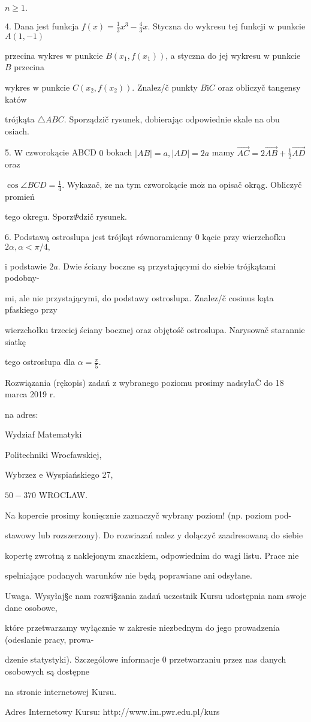 \documentclass[a4paper,12pt]{article}
\begin{document}
$n\geq 1.$

4. Dana jest funkcja $f(x)=\displaystyle \frac{1}{3}x^{3}-\frac{4}{3}x$. Styczna do wykresu tej funkcji $\mathrm{w}$ punkcie $A(1,-1)$

przecina wykres $\mathrm{w}$ punkcie $B(x_{1},f(x_{1}))$, a styczna do jej wykresu $\mathrm{w}$ punkcie $B$ przecina

wykres $\mathrm{w}$ punkcie $C(x_{2},f(x_{2}))$. Znalez/č punkty $B \mathrm{i} C$ oraz obliczyč tangensy katów

trójkąta $\triangle ABC$. Sporządzič rysunek, dobierając odpowiednie skale na obu osiach.

5. $\mathrm{W}$ czworokącie ABCD $0$ bokach $|AB|=a, |AD|=2a$ mamy $\displaystyle \vec{AC}=2\vec{AB}+\frac{1}{2}\vec{AD}$ oraz

$\displaystyle \cos\angle BCD=\frac{1}{4}$. Wykazač, $\dot{\mathrm{z}}\mathrm{e}$ na tym czworokącie $\mathrm{m}\mathrm{o}\dot{\mathrm{z}}$ na opisač okrąg. Obliczyč promień

tego okregu. Sporz$\Phi$dzič rysunek.

6. Podstawą ostroslupa jest trójkąt równoramienny $0$ kącie przy wierzchofku $2\alpha, \alpha<\pi/4,$

$\mathrm{i}$ podstawie $2a$. Dwie ściany boczne są przystajqcymi do siebie trójkątami podobny-

mi, ale nie przystającymi, do podstawy ostroslupa. Znalez/č cosinus kąta pfaskiego przy

wierzchołku trzeciej ściany bocznej oraz objętośč ostroslupa. Narysowač starannie siatkę

tego ostrosłupa dla $\displaystyle \alpha=\frac{\pi}{5}.$

Rozwiązania (rękopis) zadań $\mathrm{z}$ wybranego poziomu prosimy nadsyłaČ do 18 marca 2019 $\mathrm{r}.$

na adres:

Wydziaf Matematyki

Politechniki Wrocfawskiej,

Wybrzez $\mathrm{e}$ Wyspiańskiego 27,

$50-370$ WROCLAW.

Na kopercie prosimy $\underline{\mathrm{k}\mathrm{o}\mathrm{n}\mathrm{i}\mathrm{e}\mathrm{c}\mathrm{z}\mathrm{n}\mathrm{i}\mathrm{e}}$ zaznaczyč wybrany poziom! (np. poziom pod-

stawowy lub rozszerzony). Do rozwiazań nalez $\mathrm{y}$ dolączyč zaadresowaną do siebie

kopertę zwrotną $\mathrm{z}$ naklejonym znaczkiem, odpowiednim do wagi listu. Prace nie

spelniające podanych warunków nie będą poprawiane ani odsyłane.

Uwaga. Wysyłaj\S c nam rozwi\S zania zadań uczestnik Kursu udostępnia nam swoje dane osobowe,

które przetwarzamy wyłącznie $\mathrm{w}$ zakresie niezbednym do jego prowadzenia (odeslanie pracy, prowa-

dzenie statystyki). Szczególowe informacje $0$ przetwarzaniu przez nas danych osobowych są dostępne

na stronie internetowej Kursu.

Adres Internetowy Kursu: http://www.im.pwr.edu.pl/kurs
\end{document}
